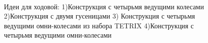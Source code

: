 \begin{enumerate}
\begin{enumerate}
\begin{enumerate}
\begin{enumerate}
	      \begin{figure}[h]
	      	\begin{minipage}[h]{0.165\linewidth}
	      		\center  
	      	\end{minipage}
	      	\begin{minipage}[h]{0.6\linewidth}
	          \caption{Идеи для ходовой: 1)Конструкция с четырьмя ведущими колесами 2)Конструкция с двумя гусеницами 3) Конструкция с четырьмя ведущими омни-колесами из набора TETRIX 4)Конструкция с четырьмя ведущими омни-колесами}
	        \end{minipage}
	      \end{figure}
	      

\end{enumerate}
\end{enumerate}
\end{enumerate}
\end{enumerate}
